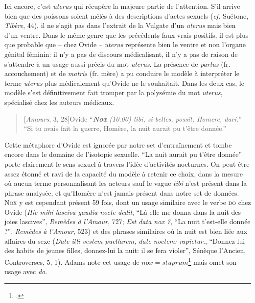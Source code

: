 Ici encore, c'est \textit{uterus} qui récupère la majeure partie de l'attention. S'il arrive bien que des poissons soient mêlés à des descriptions d'actes sexuels (\textit{cf.} Suétone, \textit{Tibère}, 44), il ne s'agit pas dans l'extrait de la Vulgate d'un \textit{uterus} mais bien d'un ventre. Dans le même genre que les précédents faux vrais positifs, il est plus que probable que -- chez Ovide -- \textit{uterus} représente bien le ventre et non l'organe génital féminin: il n'y a pas de discours médicalisant, il n'y a pas de raison de s'attendre à un usage aussi précis du mot \textit{uterus}. La présence de \textit{partus} (fr. accouchement) et de \textit{matris} (fr. mère) a pu conduire le modèle à interpréter le terme \textit{uterus} plus médicalement qu'Ovide ne le souhaitait. Dans les deux cas, le modèle s'est définitivement fait tromper par la polysémie du mot \textit{uterus}, spécialisé chez les auteurs médicaux.

\begin{quote}[\textit{Amours}, 3, 28]{Ovide}
    \enquote{\textit{\textbf{Nox} (10.00) tibi, si belles, possit, Homere, dari.}} \\
    \enquote{Si tu avais fait la guerre, Homère, la nuit aurait pu t'être donnée.}
\end{quote}

Cette métaphore d'Ovide est ignorée par notre set d'entraînement et tombe encore dans le domaine de l'isotopie sexuelle. \enquote{La nuit aurait pu t'être donnée} porte clairement le sens sexuel à travers l'idée d'activités nocturnes. On peut être assez étonné et ravi de la capacité du modèle à retenir ce choix, dans la mesure où aucun terme personnalisant les acteurs sauf le vague \textit{tibi} n'est présent dans la phrase analysée, et qu'Homère n'est jamais présent dans notre set de données. \textsc{Nox} y est cependant présent 59 fois, dont un usage similaire avec le verbe \textsc{do} chez Ovide (\textit{Hic mihi lasciva gaudia nocte dedit}, \enquote{Là elle me donna dans la nuit des joies lascives}, \textit{Remèdes à l'Amour}, 727; \textit{Est data nox ?}, \enquote{La nuit t'est-elle donnée ?}, \textit{Remèdes à l'Amour}, 523) et des phrases similaires où la nuit est bien liée aux affaires du sexe (\textit{Date illi vestem puellarem, date noctem: rapietur.}, \enquote{Donnez-lui des habits de jeunes filles, donnez-lui la nuit: il se fera violer}, Sénèque l'Ancien, Controverses, 5, 1). Adams note cet usage de $nox=stuprum$\footcite[p.178]{adams} mais omet son usage avec \textit{do}.

